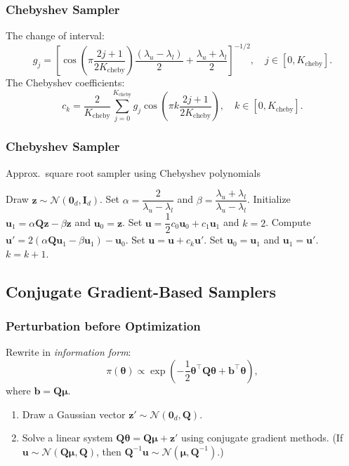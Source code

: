 \documentclass[aspectratio=169]{beamer}
\newcommand{\B}[1]{\mathbf{#1}} %
\newcommand{\Bs}[1]{\boldsymbol{#1}} %
\newcommand{\pr}[1]{\left(#1\right)} %
\newcommand{\br}[1]{\left[#1\right]} %
\begin{document}
\begin{frame}
\frametitle{Chebyshev Sampler}
The change of interval:
\[g_j = \br{\cos\pr{\pi\frac{2j+1}{2K_{\mathrm{cheby}}}}\dfrac{(\lambda_u-\lambda_l)}{2} + \dfrac{\lambda_u+\lambda_l}{2}}^{-1/2}, \quad j \in [0,K_{\mathrm{cheby}}].\]
The Chebyshev coefficients:
\[c_k = \dfrac{2}{K_{\mathrm{cheby}}} \displaystyle \sum_{j=0}^{K_{\mathrm{cheby}}} g_j \cos\pr{\pi k\frac{2j+1}{2K_{\mathrm{cheby}}}}, \quad k \in [0,K_{\mathrm{cheby}}]. \]
\end{frame}

\begin{frame}
\frametitle{Chebyshev Sampler}
\begin{algorithm}[H]
\caption{Approx.\ square root sampler using Chebyshev polynomials}
\begin{algorithmic}[1] 
\State Draw $\B{z} \sim \mathcal{N}(\B{0}_d,\B{I}_d)$.
\State Set $\alpha = \dfrac{2}{\lambda_u-\lambda_l}$ and $\beta = \dfrac{\lambda_u+\lambda_l}{\lambda_u-\lambda_l}$.
\State Initialize $\B{u}_1 = \alpha\B{Q z} - \beta\B{z}$ and $\B{u}_0 = \B{z}$. 
\State Set $\B{u} = \dfrac{1}{2}c_0\B{u}_0 + c_1\B{u}_1$ and $k=2$.
 
\State Compute $\B{u}' = 2(\alpha\B{Q}\B{u}_1 - \beta\B{u}_1) - \B{u}_0$.
\State Set $\B{u} = \B{u} + c_k\B{u}'$.
\State Set $\B{u}_0 = \B{u}_1$ and $\B{u}_1 = \B{u}'$.
\State $k = k + 1$.
\EndWhile    
\end{algorithmic}
\end{algorithm}
\end{frame}

\subsection{Conjugate Gradient-Based Samplers}
\begin{frame}
\frametitle{Perturbation before Optimization}
Rewrite in \textit{information form}:
\[
  \pi(\Bs{\theta}) \propto \exp\pr{-\dfrac{1}{2}\Bs{\theta}^{\top}\B{Q}\Bs{\theta} + \B{b}^{\top}\Bs{\theta}},
\]
where $\B{b} = \B{Q}\Bs{\mu}$.
\begin{enumerate}
    \item Draw a Gaussian vector $\B{z}' \sim \mathcal{N}(\B{0}_d,\B{Q})$.
    \item Solve a linear system \(\B{Q}\Bs{\theta} = \B{Q}\Bs{\mu} + \B{z}'\) using conjugate gradient methods. (If $\B{u} \sim \mathcal{N}(\B{Q}\Bs{\mu},\B{Q})$, then $\B{Q}^{-1}\B{u} \sim \mathcal{N}(\Bs{\mu},\B{Q}^{-1})$.)
\end{enumerate}
\end{frame}
\end{document}
